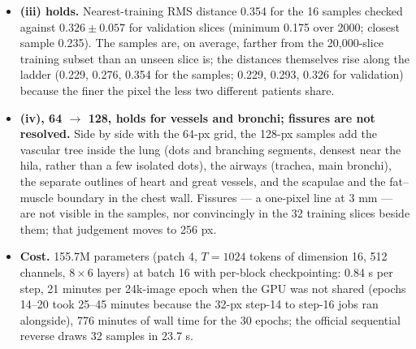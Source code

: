 \documentclass[11pt]{article}
\begin{document}
\begin{itemize}
        bright shapes, the spinal canal, ribs and scapulae, subcutaneous fat
        distinct from muscle, the liver and the bowel gas of the abdominal
        sections, and the curved table with its pad. Three are not: a body
        outline filled with a grainy texture instead of organs (row 1,
        column 3), a noisy disc (row 4, column 2), and a flat grey square
        with dark holes and no body outline (row 4, column 7); two more
        have a torn or flattened outline with streaks above it. The failure
        modes are whole-image ones (the sample is not a slice at all) rather
        than local ones, and their rate, 3--5 of 32, is higher than at 64
        px, where the equivalent count was ``a few'' of 64.
  \item \textbf{(iii) holds.} Nearest-training RMS distance 0.354 for the
        16 samples checked against $0.326 \pm 0.057$ for validation slices
        (minimum 0.175 over 2000; closest sample 0.235). The samples are, on
        average, farther from the 20,000-slice training subset than an
        unseen slice is; the distances themselves rise along the ladder
        (0.229, 0.276, 0.354 for the samples; 0.229, 0.293, 0.326 for
        validation) because the finer the pixel the less two different
        patients share.
  \item \textbf{(iv), 64 $\to$ 128, holds for vessels and bronchi; fissures
        are not resolved.} Side by side with the 64-px grid, the 128-px
        samples add the vascular tree inside the lung (dots and branching
        segments, densest near the hila, rather than a few isolated dots),
        the airways (trachea, main bronchi), the separate outlines of heart
        and great vessels, and the scapulae and the fat--muscle boundary in
        the chest wall. Fissures --- a one-pixel line at 3 mm --- are not
        visible in the samples, nor convincingly in the 32 training slices
        beside them; that judgement moves to 256 px.
  \item \textbf{Cost.} 155.7M parameters (patch 4, $T = 1024$ tokens of
        dimension 16, 512 channels, $8 \times 6$ layers) at batch 16 with
        per-block checkpointing: 0.84 s per step, 21 minutes per 24k-image
        epoch when the GPU was not shared (epochs 14--20 took 25--45 minutes
        because the 32-px step-14 to step-16 jobs ran alongside), 776
        minutes of wall time for the 30 epochs; the official sequential
        reverse draws 32 samples in 23.7 s.
\end{itemize}
\end{document}
